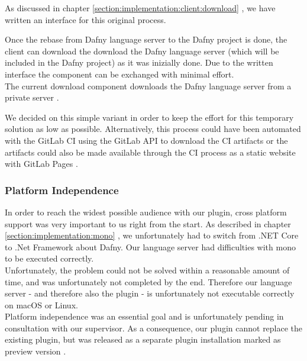 As discussed in chapter \ref{section:implementation:client:download} ,
we have written an interface for this original process.

Once the rebase from Dafny language server to the Dafny project is done,
the client can download the download the Dafny language server
(which will be included in the Dafny project) as it was inizially done.
Due to the written interface the component can be exchanged with minimal effort. \\

The current download component downloads the Dafny language server from a private server \cite{client-serverStringResources}.

We decided on this simple variant in order to keep the effort for this temporary solution as low as possible.
Alternatively, this process could have been automated with the GitLab CI using the GitLab API \cite{gitlab-api} to download the CI artifacts
or the artifacts could also be made available through the CI process as a static website with GitLab Pages \cite{gitlab-pages}.

\subsubsection{Platform Independence}
In order to reach the widest possible audience with our plugin,
cross platform support was very important to us right from the start.
As described in chapter \ref{section:implementation:mono} ,
we unfortunately had to switch from .NET Core to .Net Framework
about Dafny. Our language server had difficulties with mono to be executed correctly. \\

Unfortunately, the problem could not be solved within a reasonable amount of time,
and was unfortunately not completed by the end.
Therefore our language server - and therefore also the plugin - is
unfortunately not executable correctly on macOS or Linux. \\

Platform independence was an essential goal and is unfortunately pending in consultation with our supervisor.
As a consequence, our plugin cannot replace the existing plugin,
but was released as a separate plugin installation marked as preview version \cite{our-dafny-plugin}.
